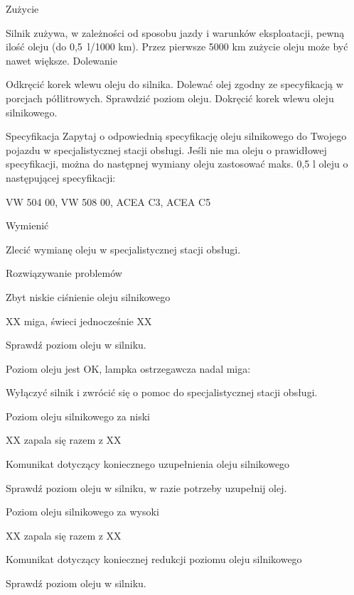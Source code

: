 Zużycie

Silnik zużywa, w zależności od sposobu jazdy i warunków eksploatacji, pewną ilość oleju (do 0,5~l/1000 km). Przez pierwsze 5000 km zużycie oleju może być
nawet większe.
Dolewanie
\begin{itemizeArrow}
	\itemArrow Odkręcić korek wlewu oleju do silnika.
	\itemArrow Dolewać olej zgodny ze specyfikacją w porcjach półlitrowych.
	\itemArrow Sprawdzić poziom oleju.
	\itemArrow Dokręcić korek wlewu oleju silnikowego.
\end{itemizeArrow}

Specyfikacja
Zapytaj o odpowiednią specyfikację oleju silnikowego do Twojego pojazdu w specjalistycznej stacji obsługi.
Jeśli nie ma oleju o prawidłowej specyfikacji, można do następnej wymiany oleju zastosować maks. 0,5 l oleju o następującej specyfikacji:
\begin{itemizeTriangle}
	\itemTriangle VW 504 00, VW 508 00, ACEA C3, ACEA C5
\end{itemizeTriangle}

Wymienić

Zlecić wymianę oleju w specjalistycznej stacji obsługi.

Rozwiązywanie problemów

Zbyt niskie ciśnienie oleju silnikowego

XX miga, świeci jednocześnie XX

\begin{itemizeArrow}
	\itemArrow Sprawdź poziom oleju w silniku.
\end{itemizeArrow}

Poziom oleju jest OK, lampka ostrzegawcza nadal miga:
\begin{itemizeArrow}
	\itemArrow Wyłączyć silnik i zwrócić się o pomoc do specjalistycznej stacji obsługi.
\end{itemizeArrow}

Poziom oleju silnikowego za niski

XX zapala się razem z XX

Komunikat dotyczący koniecznego uzupełnienia oleju silnikowego
\begin{itemizeArrow}
	\itemArrow Sprawdź poziom oleju w silniku, w razie potrzeby uzupełnij olej.
\end{itemizeArrow}

Poziom oleju silnikowego za wysoki

XX zapala się razem z XX

Komunikat dotyczący koniecznej redukcji poziomu oleju silnikowego
\begin{itemizeArrow}
	\itemArrow Sprawdź poziom oleju w silniku.
\end{itemizeArrow}


